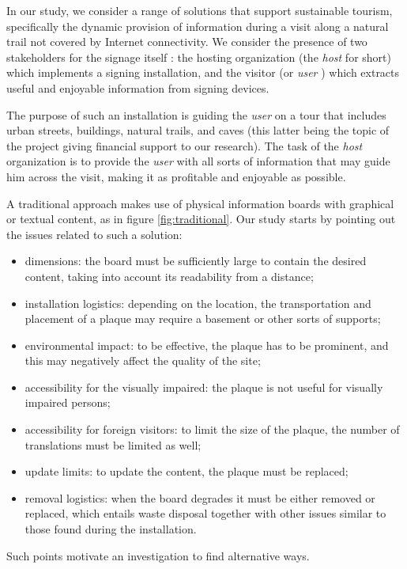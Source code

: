 \documentclass[sustainability,article,submit,pdftex,moreauthors]{Definitions/mdpi}
\begin{document}
In our study, we consider a range of solutions that support sustainable tourism, specifically the dynamic provision of information during a visit along a natural trail not covered by Internet connectivity. We consider the presence of two stakeholders for the signage itself \cite{wan22a}: the hosting organization (the {\em host} for short) which implements a signing installation, and the visitor (or {\em user} ) which extracts useful and enjoyable information from signing devices. 

The purpose of such an installation is guiding the {\em user} on a tour that includes urban streets, buildings, natural trails, and caves (this latter being the topic of the project giving financial support to our research). The task of the {\em host} organization is to provide the {\em user} with all sorts of information that may guide him across the visit, making it as profitable and enjoyable as possible.

A traditional approach makes use of physical information boards with graphical or textual content, as in figure \ref{fig:traditional}. Our study starts by pointing out the issues related to such a solution:

\begin{itemize}
	\item dimensions: the board must be sufficiently large to contain the desired content, taking into account its readability from a distance;
	\item installation logistics: depending on the location, the transportation and placement of a plaque may require a basement or other sorts of supports;
	\item environmental impact: to be effective, the plaque has to be prominent, and this may negatively affect the quality of the site; 
	\item accessibility for the visually impaired: the plaque is not useful for visually impaired persons;
	\item accessibility for foreign visitors: to limit the size of the plaque, the number of translations must be limited as well;
	\item update limits: to update the content, the plaque must be replaced;
	\item removal logistics: when the board degrades it must be either removed or replaced, which entails waste disposal together with other issues similar to those found during the installation.
\end{itemize}

Such points motivate an investigation to find alternative ways.
\end{document}
